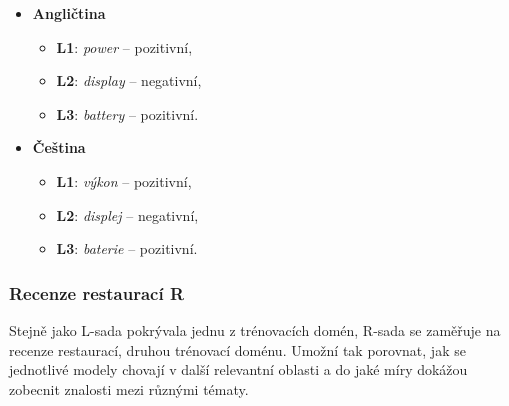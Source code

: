 \begin{itemize}
    \item \textbf{Angličtina} \\
    \begin{itemize}
        \item \textbf{L1}: \emph{power} -- pozitivní,
        \item \textbf{L2}: \emph{display} -- negativní,
        \item \textbf{L3}: \emph{battery} -- pozitivní.
    \end{itemize}
    \item \textbf{Čeština} \\
    \begin{itemize}
        \item \textbf{L1}: \emph{výkon} -- pozitivní,
        \item \textbf{L2}: \emph{displej} -- negativní,
        \item \textbf{L3}: \emph{baterie} -- pozitivní.
    \end{itemize}
\end{itemize}

\subsubsection{Recenze restaurací R}
Stejně jako L-sada pokrývala jednu z trénovacích domén, R-sada se zaměřuje na recenze restaurací, druhou trénovací doménu. Umožní tak porovnat, jak se jednotlivé modely chovají v další relevantní oblasti a do jaké míry dokážou zobecnit znalosti mezi různými tématy.

